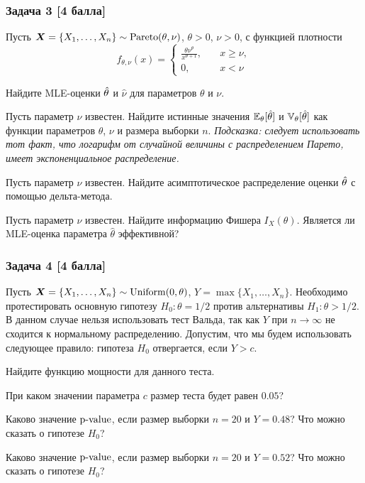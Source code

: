 \documentclass{article}
\renewenvironment{itemize}[1]{\begin{compactitem}#1}{\end{compactitem}}
\begin{document}
\subsubsection*{Задача 3 [4 балла]}
Пусть $\boldsymbol{X} =\{X_1,\dots,X_n\} \sim \mathrm{Pareto}(\theta, \nu)$, $\theta > 0$, $\nu > 0$, с функцией плотности
$$
f_{\theta, \nu}(x) =
\begin{cases}
	\frac{\theta\nu^{\theta}}{x^{\theta+1}}, \quad & x \ge \nu,\\
	0, \quad & x < \nu
\end{cases}
$$
\begin{itemize}
	\item[a)] Найдите MLE-оценки $\hat{\theta}$ и $\hat \nu$ для параметров $\theta$ и $\nu$.
	\item[c)] Пусть параметр $\nu$ известен. Найдите истинные значения $\mathbb{E}_{\theta}[\hat{\theta}]$ и $\mathbb{V}_{\theta}[\hat{\theta}]$ как функции параметров $\theta$, $\nu$ и размера выборки $n$.
	\textit{Подсказка: следует использовать тот факт, что логарифм от случайной величины с распределением Парето, имеет экспоненциальное распределение.}
	\item[b)] Пусть параметр $\nu$ известен. Найдите асимптотическое распределение оценки $\hat{\theta}$ с помощью дельта-метода.
	\item[d)] Пусть параметр $\nu$ известен. Найдите информацию Фишера $I_X(\theta)$. Является ли MLE-оценка параметра $\hat{\theta}$ эффективной?
\end{itemize}

\subsubsection*{Задача 4 [4 балла]}
Пусть $\boldsymbol{X} = \{X_1,\ldots,X_n\} \sim \mathrm{Uniform}(0,\theta)$, $Y = \max\{X_1,\ldots,X_n\}$.  Необходимо протестировать основную гипотезу $H_0:\theta = 1/2$ против альтернативы $H_1: \theta > 1/2$. В данном случае нельзя использовать тест Вальда, так как $Y$ при $n\to\infty$ не сходится к нормальному распределению. Допустим, что мы будем использовать следующее правило: гипотеза $H_0$ отвергается, если $Y > c$. 
\begin{itemize}
	\item[(a)] Найдите функцию мощности для данного теста.
	\item[(b)] При каком значении параметра $c$ размер теста будет равен $0.05$?
	\item[(c)] Каково значение $\text{p-value}$, если размер выборки $n = 20$ и $Y = 0.48$? Что можно сказать о гипотезе $H_0$?
	\item[(d)] Каково значение $\text{p-value}$, если размер выборки $n = 20$ и $Y = 0.52$? Что можно сказать о гипотезе $H_0$?
\end{itemize}
\end{document}

